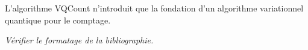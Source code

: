 \begin{comment}
\end{comment}

\Conclusion %



L'algorithme VQCount n'introduit que la fondation d'un algorithme variationnel quantique pour le comptage. 

\textcolor{mydarkred}{\textit{Vérifier le formatage de la bibliographie.}}

